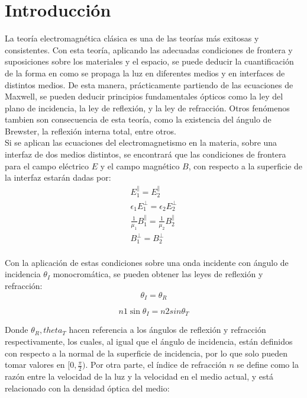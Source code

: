 \documentclass[%
 reprint,
 amsmath,amssymb,
 aps,
]{revtex4-1}
\begin{document}

\section{\label{sec:level1}Introducci\'on}

La teoría electromagnética clásica es una de las teorías más exitosas y consistentes. Con esta teoría, aplicando las adecuadas condiciones de frontera y suposiciones sobre los materiales y el espacio, se puede deducir la cuantificación de la forma en como se propaga la luz en diferentes medios y en interfaces de distintos medios. De esta manera, prácticamente partiendo de las ecuaciones de Maxwell, se pueden deducir principios fundamentales ópticos como la ley del plano de incidencia, la ley de reflexión, y la ley de refracción. Otros fenómenos tambien son consecuencia de esta teoría, como la existencia del ángulo de Brewster, la reflexión interna total, entre otros.\\

Si se aplican las ecuaciones del electromagnetismo en la materia, sobre una interfaz de dos medios distintos, se encontrará que las condiciones de frontera para el campo eléctrico $E$ y el campo magnético $B$, con respecto a la superficie de la interfaz estarán dadas por: \cite{griffiths}\\

\begin{align*}
E_1^{\parallel} = E_2^{\parallel}\\
\epsilon_1E_1^{\perp} = \epsilon_2E_2^{\perp}\\
\frac{1}{\mu_1}B_1^{\parallel} = \frac{1}{\mu_2}B_2^{\parallel}\\
B_1^{\perp} = B_2^{\perp}\\
\end{align*}

Con la aplicación de estas condiciones sobre una onda incidente con ángulo de incidencia $\theta_I$ monocromática, se pueden obtener las leyes de reflexión y refracción:\cite{griffiths}\\


\begin{equation}
	\theta_I = \theta_R
\label{reflexion}
\end{equation}

\begin{equation}
	n1\sin{\theta_I} = n2sin{\theta_T}
\label{refraccion}
\end{equation}

Donde $\theta_R, theta_T$ hacen referencia a los ángulos de reflexión y refracción respectivamente, los cuales, al igual que el ángulo de incidencia, están definidos con respecto a la normal de la superficie de incidencia, por lo que solo pueden tomar valores en $[0,\frac{\pi}{2})$. Por otra parte, el índice de refracción $n$ se define como la razón entre la velocidad de la luz y la velocidad en el medio actual, y está relacionado con la densidad óptica del medio:\\
\end{document}
